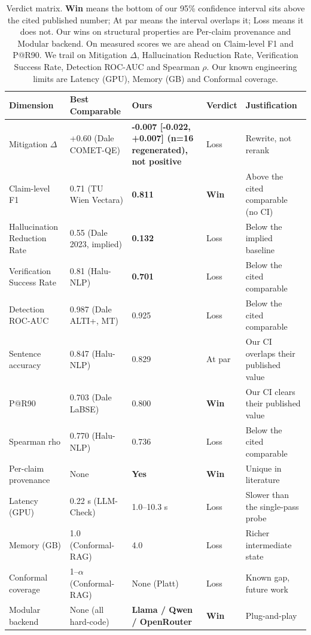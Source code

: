 \begin{table}[ht]
\centering
\small
\begin{tabular}{p{3.6cm}p{3.0cm}p{2.6cm}p{1.2cm}p{3.6cm}}
\hline
\textbf{Dimension} & \textbf{Best Comparable} & \textbf{Ours} & \textbf{Verdict} & \textbf{Justification} \\
\hline
Mitigation $\Delta$         & +0.60 (Dale COMET-QE) & \textbf{-0.007 [-0.022, +0.007] (n=16 regenerated), not positive} & Loss & Rewrite, not rerank \\
Claim-level F1               & 0.71 (TU Wien Vectara) & \textbf{0.811} & \textbf{Win} & Above the cited comparable (no CI) \\
Hallucination Reduction Rate & 0.55 (Dale 2023, implied) & \textbf{0.132} & Loss & Below the implied baseline \\
Verification Success Rate    & 0.81 (Halu-NLP) & \textbf{0.701} & Loss & Below the cited comparable \\
Detection ROC-AUC            & 0.987 (Dale ALTI+, MT) & 0.925 & Loss & Below the cited comparable \\
Sentence accuracy            & 0.847 (Halu-NLP) & 0.829 & At par & Our CI overlaps their published value \\
P@R90                        & 0.703 (Dale LaBSE) & 0.800 & \textbf{Win} & Our CI clears their published value \\
Spearman rho                 & 0.770 (Halu-NLP) & 0.736 & Loss & Below the cited comparable \\
Per-claim provenance         & None & \textbf{Yes} & \textbf{Win} & Unique in literature \\
Latency (GPU)                & 0.22 s (LLM-Check) & 1.0--10.3 s & Loss & Slower than the single-pass probe \\
Memory (GB)                  & 1.0 (Conformal-RAG) & 4.0 & Loss & Richer intermediate state \\
Conformal coverage           & 1--$\alpha$ (Conformal-RAG) & None (Platt) & Loss & Known gap, future work \\
Modular backend              & None (all hard-code) & \textbf{Llama / Qwen / OpenRouter} & \textbf{Win} & Plug-and-play \\
\hline
\end{tabular}
\caption{Verdict matrix. \textbf{Win} means the bottom of our 95\% confidence
interval sits above the cited published number; At par means the
interval overlaps it; Loss means it does not. Our wins on structural
properties are Per-claim provenance and Modular backend. On measured
scores we are ahead on Claim-level F1 and P@R90. We trail on Mitigation
$\Delta$, Hallucination Reduction Rate, Verification Success Rate,
Detection ROC-AUC and Spearman $\rho$. Our known engineering limits are
Latency (GPU), Memory (GB) and Conformal coverage.}
\label{tab:verdict}
\end{table}

